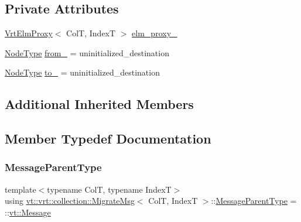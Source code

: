 \subsection*{Private Attributes}
\begin{DoxyCompactItemize}
\item 
\hyperlink{structvt_1_1vrt_1_1collection_1_1_vrt_elm_proxy}{Vrt\+Elm\+Proxy}$<$ ColT, IndexT $>$ \hyperlink{structvt_1_1vrt_1_1collection_1_1_migrate_msg_a1c6c855daa4709e8eecda251704e9f6e}{elm\+\_\+proxy\+\_\+}
\item 
\hyperlink{namespacevt_a866da9d0efc19c0a1ce79e9e492f47e2}{Node\+Type} \hyperlink{structvt_1_1vrt_1_1collection_1_1_migrate_msg_a1b6255e6321bcac5244caf9f01c1fb47}{from\+\_\+} = uninitialized\+\_\+destination
\item 
\hyperlink{namespacevt_a866da9d0efc19c0a1ce79e9e492f47e2}{Node\+Type} \hyperlink{structvt_1_1vrt_1_1collection_1_1_migrate_msg_a8bb8dc33230f27eef17bc2beb07ab32a}{to\+\_\+} = uninitialized\+\_\+destination
\end{DoxyCompactItemize}
\subsection*{Additional Inherited Members}


\subsection{Member Typedef Documentation}
\mbox{\label{structvt_1_1vrt_1_1collection_1_1_migrate_msg_a3453db7704db7db17a7afef046dba844}} 
\subsubsection{\texorpdfstring{Message\+Parent\+Type}{MessageParentType}}
{\footnotesize\ttfamily template$<$typename ColT, typename IndexT$>$ \\
using \hyperlink{structvt_1_1vrt_1_1collection_1_1_migrate_msg}{vt\+::vrt\+::collection\+::\+Migrate\+Msg}$<$ ColT, IndexT $>$\+::\hyperlink{structvt_1_1messaging_1_1_active_msg_ac2e6d93267991027ce78c968b17064c7}{Message\+Parent\+Type} =  \+::\hyperlink{namespacevt_a3a3ddfef40b4c90915fa43cdd5f129ea}{vt\+::\+Message}}




